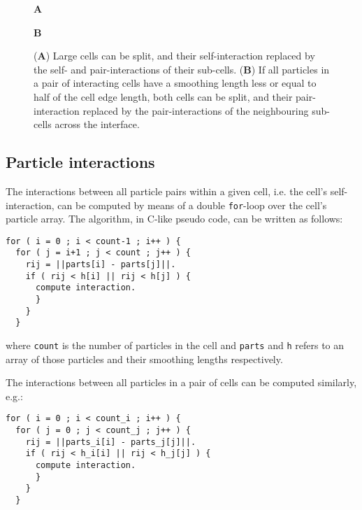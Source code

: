 \documentclass[a4paper,conference]{IEEEtran}
\newcommand{\bsf}[1]
    {\textbf{\textsf{#1}}}
\begin{document}
\begin{figure}
    \centerline{{\scriptsize\bsf A} }
    
    \vspace{2ex}
    
    \centerline{{\scriptsize\bsf B} }
    
    \caption{({\bsf A}) Large cells can be split, and their
        self-interaction replaced by the self- and pair-interactions
        of their sub-cells.
        ({\bsf B}) If all particles in a pair of interacting cells have a smoothing
        length less or equal to half of the cell edge length, both cells can be
        split, and their pair-interaction replaced by the pair-interactions
        of the neighbouring sub-cells across the interface.}
    \label{fig:SplitCell}
    \label{fig:SplitPair}
\end{figure}


\subsection{Particle interactions}

The interactions between all particle pairs within a given cell,
i.e. the cell's self-interaction, can be computed by means of
a double {\tt for}-loop over the cell's particle array.
The algorithm, in C-like pseudo code, can be written as follows:

\begin{center}\begin{minipage}{0.9\columnwidth}
    \begin{lstlisting}
for ( i = 0 ; i < count-1 ; i++ ) {
  for ( j = i+1 ; j < count ; j++ ) {
    rij = ||parts[i] - parts[j]||.
    if ( rij < h[i] || rij < h[j] ) {
      compute interaction.
      }
    }
  }
    \end{lstlisting}
\end{minipage}\end{center}

\noindent where {\tt count} is the number of particles in the
cell and {\tt parts} and {\tt h} refers to an array of those
particles and their smoothing lengths respectively.

The interactions between all particles in a pair of cells
can be computed similarly, e.g.:
   
\begin{center}\begin{minipage}{0.9\columnwidth}
    \begin{lstlisting}
for ( i = 0 ; i < count_i ; i++ ) {
  for ( j = 0 ; j < count_j ; j++ ) {
    rij = ||parts_i[i] - parts_j[j]||.
    if ( rij < h_i[i] || rij < h_j[j] ) {
      compute interaction.
      }
    }
  }
    \end{lstlisting}
\end{minipage}\end{center}
\end{document}

